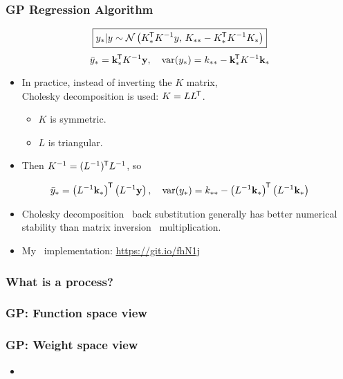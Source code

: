 \begin{frame} \frametitle{GP Regression Algorithm}
\begin{equation}
  \boxed{ y_*|y \sim \mathcal{N}\left(K_*^{\mkern-1.5mu\mathsf{T}} K^{-1}y,\,K_{**}-K_*^{\mkern-1.5mu\mathsf{T}} K^{-1}K_*\right) }
\end{equation}
\begin{equation}
  \bar{y}_* = \mathbf{k}_*^{\mkern-1.5mu\mathsf{T}} K^{-1} \mathbf{y}, \quad
  \mathrm{var}(y_*) = k_{**} - \mathbf{k}_*^{\mkern-1.5mu\mathsf{T}} K^{-1} \mathbf{k}_*
\end{equation}
\vspace{-3mm}
\begin{itemize}
  \item In practice, instead of inverting the $K$ matrix, \\
    Cholesky decomposition is used: $K = LL^{\mkern-1.5mu\mathsf{T}}$.
  \begin{itemize}
    \item $K$ is symmetric.
    \item $L$ is triangular.
  \end{itemize}
  \vspace{1mm}
  \item Then $K^{-1} = (L^{-1})^{\mkern-1.5mu\mathsf{T}} L^{-1}$, so
\end{itemize}
\begin{equation}
  \bar{y}_* = \left(L^{-1}\mathbf{k}_*\right)^{\mkern-1.5mu\mathsf{T}} \left(L^{-1} \mathbf{y}\right),
  \quad
  \mathrm{var}(y_*) = k_{**} -
    \left(L^{-1}\mathbf{k}_*\right)^{\mkern-1.5mu\mathsf{T}}
    \left(L^{-1}\mathbf{k}_*\right)
\end{equation}
\vspace{-5mm}
\begin{itemize}
  \item Cholesky decomposition \plus\ back substitution generally has better
    numerical stability than matrix inversion \plus\ multiplication.
  \vspace{1mm}
  \item My \cpp\ implementation:
    {\small\url{https://git.io/fhN1j}}
\end{itemize}
\end{frame}

\begin{frame} \frametitle{What is a process?}
\end{frame}

\begin{frame} \frametitle{GP: Function space view}
\end{frame}

\begin{frame} \frametitle{GP: Weight space view}
\begin{itemize}
  \item {}
\end{itemize}
\end{frame}


